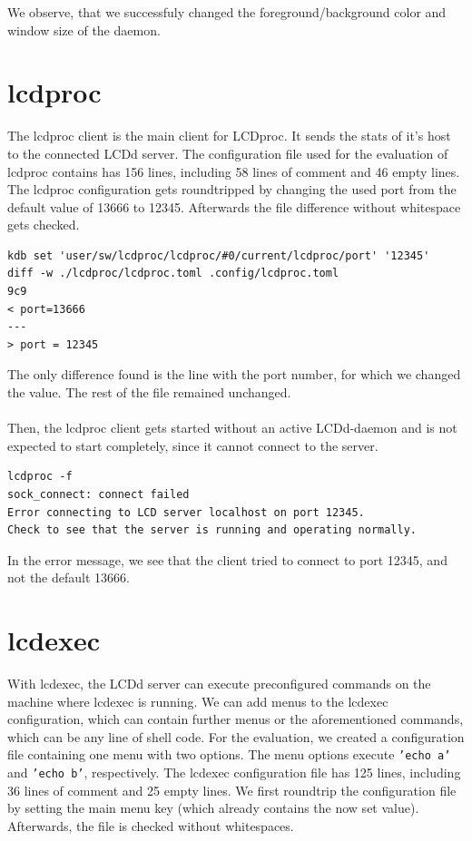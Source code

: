 \documentclass[draft,final]{vutinfth} %
\begin{document}
\FloatBarrier
We observe, that we successfuly changed the foreground/background color and window size of the daemon.

\section{lcdproc}
The lcdproc client is the main client for LCDproc. It sends the stats of it's host to the connected LCDd server.
The configuration file used for the evaluation of lcdproc contains has 156 lines, including 58 lines of comment and 46 empty lines.
The lcdproc configuration gets roundtripped by changing the used port from the default value of 13666 to 12345.
Afterwards the file difference without whitespace gets checked.
\begin{Verbatim}[frame=single, fontsize=\small]
kdb set 'user/sw/lcdproc/lcdproc/#0/current/lcdproc/port' '12345'
diff -w ./lcdproc/lcdproc.toml .config/lcdproc.toml
9c9
< port=13666
---
> port = 12345
\end{Verbatim}

The only difference found is the line with the port number, for which we changed the value.
The rest of the file remained unchanged.
\\\\
Then, the lcdproc client gets started without an active LCDd-daemon and is not expected to start completely, since it cannot connect to the server.
\begin{Verbatim}[frame=single, fontsize=\small]
lcdproc -f
sock_connect: connect failed
Error connecting to LCD server localhost on port 12345.
Check to see that the server is running and operating normally.
\end{Verbatim}
In the error message, we see that the client tried to connect to port 12345, and not the default 13666.

\section{lcdexec}
With lcdexec, the LCDd server can execute preconfigured commands on the machine where lcdexec is running.
We can add menus to the lcdexec configuration, which can contain further menus or the aforementioned commands, which can be any line of shell code.
For the evaluation, we created a configuration file containing one menu with two options.
The menu options execute \texttt{'echo a'} and \texttt{'echo b'}, respectively.
The lcdexec configuration file has 125 lines, including 36 lines of comment and 25 empty lines.
We first roundtrip the configuration file by setting the main menu key (which already contains the now set value).
Afterwards, the file is checked without whitespaces.
\end{document}
